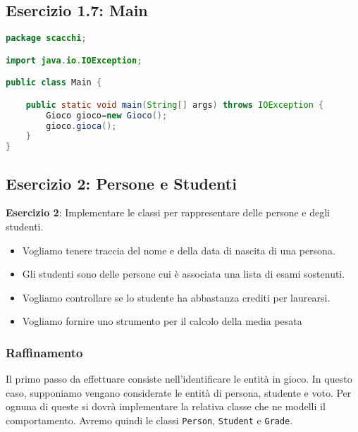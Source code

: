 \documentclass{article}
\begin{document}
\subsection{Esercizio 1.7: Main}
\begin{lstlisting}[language=Java,escapechar=|]
package scacchi;

import java.io.IOException;

public class Main {

	public static void main(String[] args) throws IOException {
		Gioco gioco=new Gioco();
		gioco.gioca();
	}
}

\end{lstlisting}
\subsection{Esercizio 2: Persone e Studenti}
\begin{framed}
\textbf{Esercizio 2}: Implementare le classi per rappresentare delle persone e degli studenti.
\begin{itemize}
\item  Vogliamo tenere traccia del nome e della data di nascita di una persona.
\item Gli studenti sono delle persone cui \`e associata una lista di esami sostenuti.
\item Vogliamo controllare se lo studente ha abbastanza crediti per laurearsi.
\item Vogliamo fornire uno strumento per il calcolo della media pesata
\end{itemize}
\end{framed}

\subsubsection{Raffinamento}
Il primo passo da effettuare consiste nell'identificare le entità in gioco.
In questo caso, supponiamo vengano considerate le entità di persona, studente e voto.
Per ognuna di queste si dovrà implementare la relativa classe che ne modelli il comportamento.
Avremo quindi le classi \texttt{Person}, \texttt{Student} e \texttt{Grade}.
\end{document}
